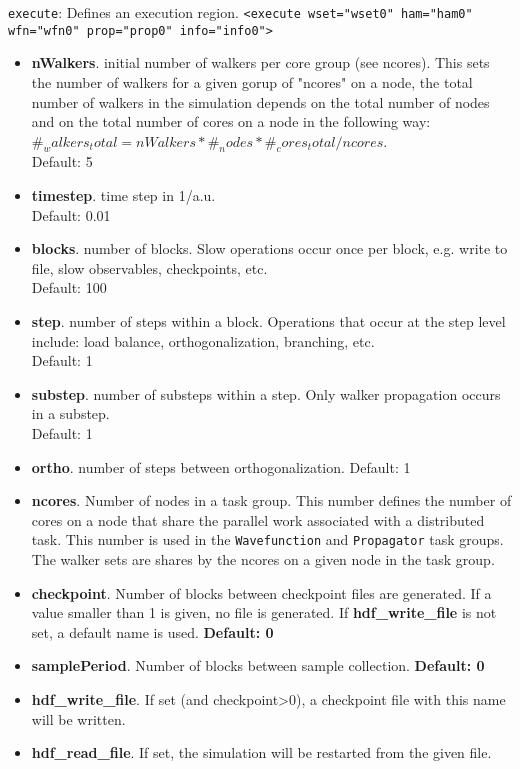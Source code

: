 \texttt{execute}: Defines an execution region. 
\texttt{<execute wset="wset0" ham="ham0" wfn="wfn0" prop="prop0" info="info0">}
\begin{itemize}
\item \textbf{nWalkers}. initial number of walkers per core group (see ncores). This sets the number of walkers for a given gorup of "ncores" on a node, the total number of walkers in the simulation depends on the total number of nodes and on the total number of cores on a node in the following way: $ \#_walkers_total = nWalkers * \#_nodes * \#_cores_total / ncores $. \\ 
    Default: 5
\item \textbf{timestep}. time step in 1/a.u. \\
    Default: 0.01
\item \textbf{blocks}. number of blocks. Slow operations occur once per block, e.g. write to file, slow observables, checkpoints, etc. \\
    Default: 100
\item \textbf{step}. number of steps within a block. Operations that occur at the step level include: load balance, orthogonalization, branching, etc. \\
    Default: 1
\item \textbf{substep}. number of substeps within a step. Only walker propagation occurs in a substep. \\
    Default: 1
\item \textbf{ortho}. number of steps between orthogonalization.
    Default: 1
\item \textbf{ncores}. Number of nodes in a task group. This number defines the number of cores on a node that share the parallel work associated with a distributed task. This number is used in the \texttt{Wavefunction} and \texttt{Propagator} task groups. The walker sets are shares by the ncores on a given node in the task group.
\item \textbf{checkpoint}. Number of blocks between checkpoint files are generated. If a value smaller than 1 is given, no file is generated. If \textbf{hdf\_write\_file} is not set, a default name is used. \textbf{Default: 0} 
\item \textbf{samplePeriod}. Number of blocks between sample collection. \textbf{Default: 0}
\item \textbf{hdf\_write\_file}. If set (and checkpoint>0), a checkpoint file with this name will be written.
\item \textbf{hdf\_read\_file}. If set, the simulation will be restarted from the given file.\\
\end{itemize}

